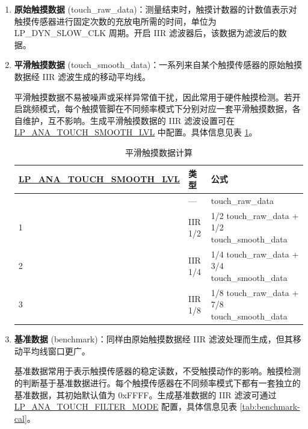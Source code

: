 \documentclass[main\_\_CN.tex]{subfiles}
\begin{document}
\begin{enumerate}
    \item \textbf{原始触摸数据} (touch\_raw\_data)：测量结束时，触摸计数器的计数值表示对触摸传感器进行固定次数的充放电所需的时间，单位为 LP\_DYN\_SLOW\_CLK 周期。开启 IIR 滤波器后，该数据为滤波后的数据。
    \item \textbf{平滑触摸数据} (touch\_smooth\_data)：一系列来自某个触摸传感器的原始触摸数据经 IIR 滤波生成的移动平均线。

    平滑触摸数据不易被噪声或采样异常值干扰，因此常用于硬件触摸检测。若开启跳频模式，每个触摸管脚在不同频率模式下分别对应一套平滑触摸数据，各自维护，互不影响。生成平滑触摸数据的 IIR 滤波设置可在 \hyperref[fielddesc:LPANATOUCHSMOOTHLVL]{LP\_ANA\_TOUCH\_SMOOTH\_LVL} 中配置。具体信息见表 \ref{tab:smooth-cal}。

    \begin{longtable}[c]{|p{5.5 cm}|p{1.5cm}|p{8.5cm}|}
        \caption{平滑触摸数据计算}
        \label{tab:smooth-cal}\\
        \hline
        \rowcolor{lightgray}
        \textbf{\hyperref[fielddesc:LPANATOUCHSMOOTHLVL]{LP\_ANA\_TOUCH\_SMOOTH\_LVL}} & \textbf{类型} & \textbf{公式}\\ 
        \hline
        \endhead
        \endfoot
        \endlastfoot
        0  & --- & touch\_raw\_data  \\\hline
        1  & IIR 1/2 & 1/2 touch\_raw\_data + 1/2 touch\_smooth\_data \\\hline
        2  & IIR 1/4 & 1/4 touch\_raw\_data + 3/4 touch\_smooth\_data \\\hline
        3  & IIR 1/8 & 1/8 touch\_raw\_data + 7/8 touch\_smooth\_data \\\hline
    \end{longtable}

    \item \textbf{基准数据} (benchmark)：同样由原始触摸数据经 IIR 滤波处理而生成，但其移动平均线窗口更广。
    
    基准数据常用于表示触摸传感器的稳定读数，不受触摸动作的影响。触摸检测的判断基于基准数据进行。每个触摸传感器在不同频率模式下都有一套独立的基准数据，其初始默认值为 0xFFFF。生成基准数据的 IIR 滤波可通过 \hyperref[fielddesc:LPANATOUCHFILTERMODE]{LP\_ANA\_TOUCH\_FILTER\_MODE} 配置，具体信息见表 \ref{tab:benchmark-cal}。


\end{enumerate}
\end{document}
